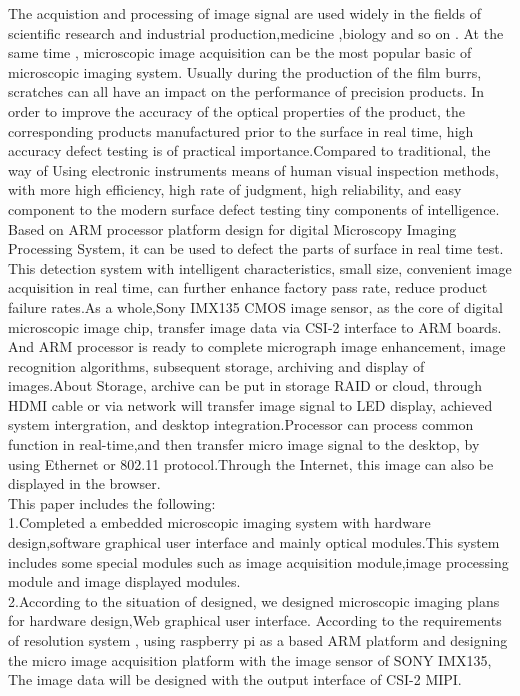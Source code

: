 \begin{enabstract}
	The acquistion and processing of image signal are used widely in the fields of scientific research and industrial production,medicine ,biology and so on . At the same time , microscopic image acquisition can be the most popular basic of microscopic imaging system. Usually during the production of the film burrs, scratches  can all have an impact on the performance of precision products. In order to improve the accuracy of the optical properties of the product, the corresponding products manufactured prior to the surface in real time, high accuracy defect testing is of practical importance.Compared to traditional, the way of Using electronic instruments  means of human visual inspection methods, with more high efficiency, high rate of judgment, high reliability, and easy component to the modern surface defect testing tiny components of intelligence.\\
	Based on ARM processor platform design for digital Microscopy Imaging Processing System, it can be used to defect the parts of surface in real time test. This detection system with intelligent characteristics, small size, convenient image acquisition in real time, can further enhance factory pass rate, reduce product failure rates.As a whole,Sony IMX135 CMOS image sensor, as the core of digital microscopic image chip, transfer image data via CSI-2 interface to ARM boards. And ARM processor is ready to complete micrograph image enhancement, image recognition algorithms, subsequent storage, archiving and display of images.About Storage, archive can be put in storage RAID or cloud, through HDMI cable or via network will transfer image signal to LED display, achieved system intergration, and desktop integration.Processor can process common function in real-time,and then transfer micro image signal to the desktop, by using Ethernet or 802.11 protocol.Through the Internet, this image can also be displayed in the browser.\\
	This paper includes the following:\\
	1.Completed a embedded microscopic imaging system with hardware design,software graphical user interface and mainly optical modules.This system includes some special modules such as image acquisition module,image processing module and image displayed modules. \\
	2.According to the situation of designed, we designed microscopic imaging plans for hardware design,Web graphical user interface. According to the requirements of resolution system , using raspberry pi as a based ARM platform and designing the micro image acquisition platform with the image sensor of SONY IMX135, The image data will be designed with the output interface of CSI-2 MIPI.\\

\end{enabstract}
